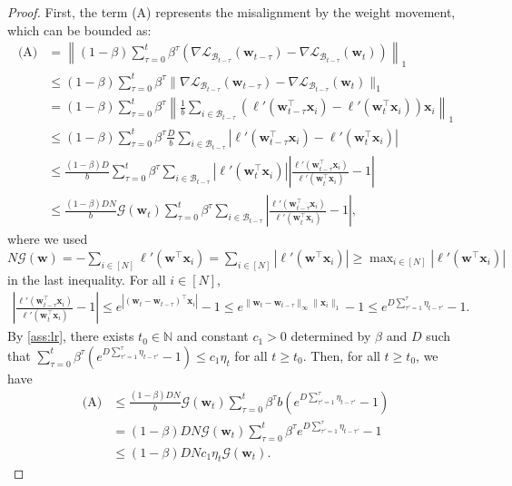 \documentclass[10pt,a4paper]{amsart}
\def\bw{{\mathbf w}}
\def\bx{{\mathbf x}}
\def\gB{{\mathcal{B}}}
\def\gG{{\mathcal{G}}}
\newcommand{\Ls}{\mathcal{L}}
\begin{document}
\begin{proof}
    First, the term (A) represents the misalignment by the weight movement, which can be bounded as:
    \begin{align*}
        \textrm{(A)} &= \left\| (1-\beta) \sum_{\tau=0}^t \beta^\tau (\nabla \Ls_{\gB_{t-\tau}} (\bw_{t-\tau}) - \nabla \Ls_{\gB_{t-\tau}} (\bw_t)) \right\|_1 \\
        &\leq (1-\beta) \sum_{\tau=0}^t \beta^\tau \|\nabla \Ls_{\gB_{t-\tau}}(\bw_{t-\tau}) - \nabla \Ls_{\gB_{t-\tau}}(\bw_{t})\|_1 \\
        &= (1-\beta) \sum_{\tau=0}^t \beta^\tau \left\| \frac{1}{b} \sum_{i\in \gB_{t-\tau}}(\ell'(\bw_{t-\tau}^\top \bx_i) - \ell'(\bw_t^\top \bx_i)) \bx_i \right \|_1 \\
        &\leq (1-\beta) \sum_{\tau=0}^t \beta^\tau \frac Db  \sum_{i\in \gB_{t-\tau}} |\ell'(\bw_{t-\tau}^\top \bx_i) - \ell'(\bw_t^\top \bx_i)| \\
        &\leq \frac{(1-\beta) D}{b} \sum_{\tau=0}^t \beta^\tau \sum_{i\in \gB_{t-\tau}} |\ell'(\bw_t^\top \bx_i)| \left| \frac{\ell'(\bw_{t-\tau}^\top \bx_i)}{\ell'(\bw_t^\top \bx_i)} -1 \right| \\
        &\leq \frac{(1-\beta) D N}{b} \gG(\bw_t) \sum_{\tau=0}^t \beta^\tau \sum_{i\in \gB_{t-\tau}} \left| \frac{\ell'(\bw_{t-\tau}^\top \bx_i)}{\ell'(\bw_t^\top \bx_i)} -1 \right|,
    \end{align*}
    where we used $N \gG(\bw) = - \sum_{i\in [N]}\ell'(\bw^\top\bx_i) = \sum_{i\in [N]}|\ell'(\bw^\top\bx_i)| \geq \max_{i\in [N]} |\ell'(\bw^\top \bx_i)|$ in the last inequality.
    For all $i\in [N]$,
    \begin{align*}
        \left| \frac{\ell'(\bw_{t-\tau}^\top \bx_i)}{\ell'(\bw_t^\top \bx_i)} -1 \right| \leq e^{|(\bw_t - \bw_{t-\tau})^\top \bx_i|}-1 \leq e^{\|\bw_t-\bw_{t-\tau}\|_\infty \|\bx_i\|_1}-1 \leq e^{D\sum_{\tau'=1}^{\tau}\eta_{t-\tau'}}-1.
    \end{align*}
    By \cref{ass:lr}, there exists $t_0\in \mathbb N$ and constant $c_1>0$ determined by $\beta$ and $D$ such that $\sum_{\tau=0}^t\beta^\tau (e^{D\sum_{\tau'=1}^\tau \eta_{t-\tau'}}-1) \leq c_1 \eta_t$ for all $t\geq t_0$. Then, for all $t\geq t_0$, we have
    \begin{align*}
        \textrm{(A)} &\leq \frac{(1-\beta) D N}{b} \gG(\bw_t) \sum_{\tau=0}^t \beta^\tau b ( e^{D\sum_{\tau'=1}^{\tau}\eta_{t-\tau'}}-1) \\
        &= (1-\beta) D N  \gG(\bw_t) \sum_{\tau=0}^t \beta^\tau e^{D\sum_{\tau'=1}^{\tau}\eta_{t-\tau'}}-1 \\
        &\leq (1-\beta) D N c_1 \eta_t \gG(\bw_t).    
    \end{align*}
    

\end{proof}
\end{document}
